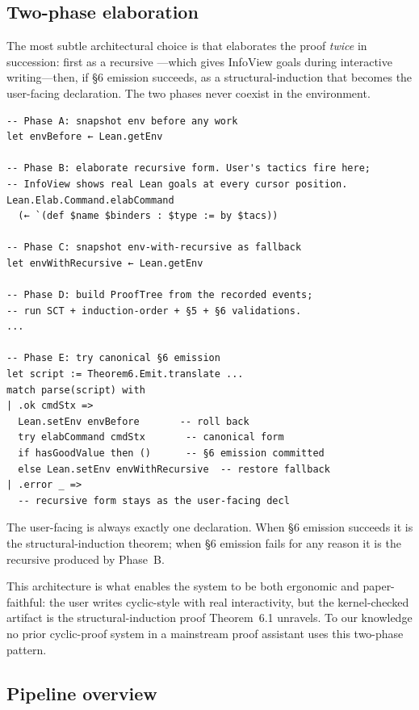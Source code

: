 \subsection{Two-phase elaboration}

The most subtle architectural choice is that  elaborates
the proof \emph{twice} in succession: first as a recursive
---which gives InfoView goals during interactive
writing---then, if §6 emission succeeds, as a structural-induction
 that becomes the user-facing declaration. The two phases
never coexist in the environment.

\begin{lstlisting}
-- Phase A: snapshot env before any work
let envBefore ← Lean.getEnv

-- Phase B: elaborate recursive form. User's tactics fire here;
-- InfoView shows real Lean goals at every cursor position.
Lean.Elab.Command.elabCommand
  (← `(def $name $binders : $type := by $tacs))

-- Phase C: snapshot env-with-recursive as fallback
let envWithRecursive ← Lean.getEnv

-- Phase D: build ProofTree from the recorded events;
-- run SCT + induction-order + §5 + §6 validations.
...

-- Phase E: try canonical §6 emission
let script := Theorem6.Emit.translate ...
match parse(script) with
| .ok cmdStx =>
  Lean.setEnv envBefore       -- roll back
  try elabCommand cmdStx       -- canonical form
  if hasGoodValue then ()      -- §6 emission committed
  else Lean.setEnv envWithRecursive  -- restore fallback
| .error _ =>
  -- recursive form stays as the user-facing decl
\end{lstlisting}

The user-facing  is always exactly one declaration. When §6
emission succeeds it is the structural-induction theorem; when §6 emission
fails for any reason it is the recursive  produced by Phase~B.

This architecture is what enables the system to be both ergonomic and
paper-faithful: the user writes cyclic-style with real interactivity, but
the kernel-checked artifact is the structural-induction proof Theorem~6.1
unravels. To our knowledge no prior cyclic-proof system in a mainstream
proof assistant uses this two-phase pattern.

\subsection{Pipeline overview}

